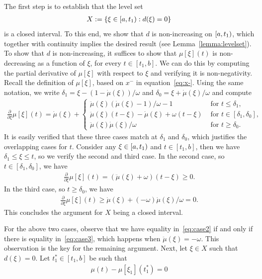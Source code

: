 \documentclass[a4paper]{article}
\theoremstyle{definition}
\theoremstyle{plain}
\begin{document}
The first step is to establish that the level set
\begin{align}
  X := \{ \xi \in [a,t_{1}) : d(\xi) = 0 \}
\end{align}
is a closed interval. To this end, we show that $d$ is non-increasing on
$[a,t_{1})$, which together with continuity implies the desired result
(see Lemma~\ref{lemma:levelset}).
%
To show that $d$ is non-increasing, it suffices to show that $\mu[\xi](t)$ is
non-decreasing as a function of $\xi$, for every $t \in [t_{1}, b]$.
%
We can do this by computing the partial derivative of $\mu[\xi]$ with respect to $\xi$
and verifying it is non-negativity.
%
Recall the definition of $\mu[\xi]$, based on $x^{-}$ in equation~\eqref{eq:x-}.
%
Using the same notation, we write
$\delta_{1} = \xi - (1 - \dot{\mu}(\xi))/\omega$ and
$\delta_{0} = \xi + \dot{\mu}(\xi)/\omega$ and compute
%
\begin{align}
  \frac{\partial}{\partial \xi} \mu[\xi](t) =
  \dot{\mu}(\xi) +
  \begin{cases}
    \ddot{\mu}(\xi)(\dot{\mu}(\xi)-1)/\omega - 1 &\text{ for } t \leq \delta_{1} , \\
    \ddot{\mu}(\xi)(t-\xi) - \dot{\mu}(\xi) + \omega(t-\xi) &\text{ for } t \in [\delta_{1},\delta_{0}] , \\
    \ddot{\mu}(\xi)\dot{\mu}(\xi)/ \omega &\text{ for } t \geq \delta_{0} .
  \end{cases}
\end{align}
%
It is easily verified that these three cases match at $\delta_{1}$ and $\delta_{0}$, which
justifies the overlapping cases for $t$.
%
Consider any $\xi \in [a,t_{1})$ and $t \in [t_{1}, b]$, then we have $\delta_{1} \leq \xi \leq t$,
so we verify the second and third case.
%
In the second case, so $t \in [\delta_{1},\delta_{0}]$, we have
\begin{align}\label{eq:case2}
  \frac{\partial}{\partial \xi} \mu[\xi](t) = (\ddot{\mu}(\xi) + \omega)(t-\xi) \geq 0 .
\end{align}
%
In the third case, so $t \geq \delta_{0}$, we have
\begin{align}\label{eq:case3}
  \frac{\partial}{\partial \xi} \mu[\xi](t) \geq \dot{\mu}(\xi) + (-\omega)\dot{\mu}(\xi)/\omega = 0 .
\end{align}
This concludes the argument for $X$ being a closed interval.

For the above two cases, observe that we have equality in~\eqref{eq:case2} if
and only if there is equality in~\eqref{eq:case3}, which happens when
$\ddot{\mu}(\xi) = -\omega$.
%
This observation is the key for the remaining argument.
%
Next, let $\xi \in X$ such that $d(\xi) = 0$.
%
Let $t_{1}^{*} \in [t_{1}, b]$ be such that
\begin{align}
  \mu(t) - \mu[\xi_{1}](t_{1}^{*}) = 0
\end{align}
%
\end{document}
